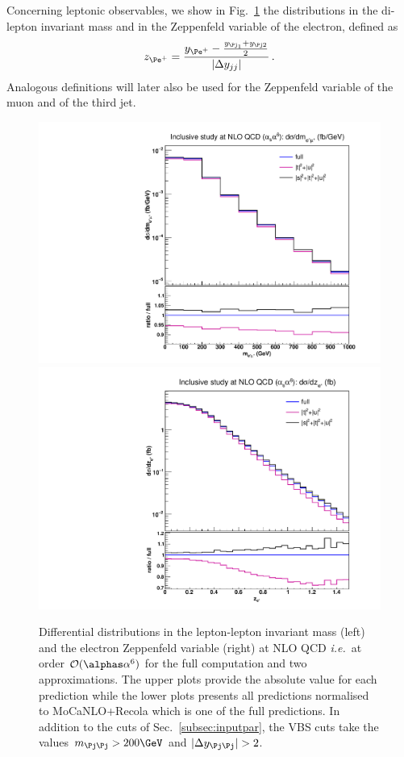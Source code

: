Concerning leptonic observables, we show in Fig.~\ref{fig:mjjdyjj_1d_3} the distributions in the di-lepton invariant mass and in the Zeppenfeld variable of the electron, defined as
%
\begin{equation}
  z_{\Pe^+} = \frac{y_{\Pe^+}-\frac{y_{\Pj_1}+y_{\Pj2}}2}{|\Delta y_{jj}|} \,.
  \label{eq:Zeppenfeld}
\end{equation}
%
Analogous definitions will later also be used for the Zeppenfeld variable of the muon and of the third jet.
%
\begin{figure}[hbt]
\centering
{\includegraphics[scale=0.35]{figures/scanfigures/mll_nlo.pdf}}
{\includegraphics[scale=0.35]{figures/scanfigures/zel_nlo.pdf}}
\caption{Differential distributions in the lepton-lepton invariant mass (left) and the electron Zeppenfeld variable (right) at NLO QCD \emph{i.e.}\ at order $\mathcal{O}(\alphas\alpha^6)$ for the full computation and two approximations.
The upper plots provide the absolute value for each prediction while the lower plots presents all predictions normalised to {\sc MoCaNLO}+{\sc Recola} which is one of the full predictions.
In addition to the cuts of Sec.~\ref{subsec:inputpar}, the VBS cuts take the values $m_{\Pj\Pj}>200 \GeV$ and $|\Delta y_{\Pj\Pj}|>2$.} 
\label{fig:mjjdyjj_1d_3}
\end{figure}
